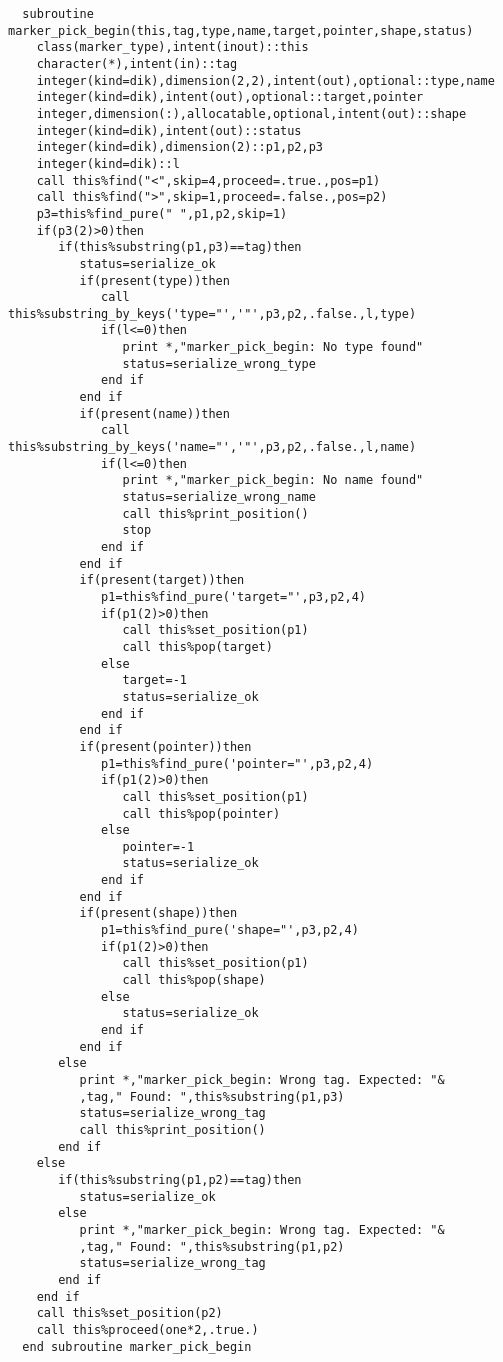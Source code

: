 \begin{Verbatim}
  subroutine marker_pick_begin(this,tag,type,name,target,pointer,shape,status)
    class(marker_type),intent(inout)::this
    character(*),intent(in)::tag
    integer(kind=dik),dimension(2,2),intent(out),optional::type,name
    integer(kind=dik),intent(out),optional::target,pointer
    integer,dimension(:),allocatable,optional,intent(out)::shape
    integer(kind=dik),intent(out)::status
    integer(kind=dik),dimension(2)::p1,p2,p3
    integer(kind=dik)::l
    call this%find("<",skip=4,proceed=.true.,pos=p1)
    call this%find(">",skip=1,proceed=.false.,pos=p2)
    p3=this%find_pure(" ",p1,p2,skip=1)
    if(p3(2)>0)then
       if(this%substring(p1,p3)==tag)then
          status=serialize_ok
          if(present(type))then
             call this%substring_by_keys('type="','"',p3,p2,.false.,l,type)
             if(l<=0)then
                print *,"marker_pick_begin: No type found"
                status=serialize_wrong_type
             end if
          end if
          if(present(name))then
             call this%substring_by_keys('name="','"',p3,p2,.false.,l,name)
             if(l<=0)then
                print *,"marker_pick_begin: No name found"
                status=serialize_wrong_name
                call this%print_position()
                stop
             end if
          end if
          if(present(target))then
             p1=this%find_pure('target="',p3,p2,4)
             if(p1(2)>0)then
                call this%set_position(p1)
                call this%pop(target)
             else
                target=-1
                status=serialize_ok
             end if
          end if
          if(present(pointer))then
             p1=this%find_pure('pointer="',p3,p2,4)
             if(p1(2)>0)then
                call this%set_position(p1)
                call this%pop(pointer)
             else
                pointer=-1
                status=serialize_ok
             end if
          end if
          if(present(shape))then
             p1=this%find_pure('shape="',p3,p2,4)
             if(p1(2)>0)then
                call this%set_position(p1)
                call this%pop(shape)
             else
                status=serialize_ok
             end if
          end if
       else
          print *,"marker_pick_begin: Wrong tag. Expected: "&
          ,tag," Found: ",this%substring(p1,p3)
          status=serialize_wrong_tag
          call this%print_position()
       end if
    else
       if(this%substring(p1,p2)==tag)then
          status=serialize_ok
       else
          print *,"marker_pick_begin: Wrong tag. Expected: "&
          ,tag," Found: ",this%substring(p1,p2)
          status=serialize_wrong_tag
       end if
    end if
    call this%set_position(p2)
    call this%proceed(one*2,.true.)
  end subroutine marker_pick_begin
\end{Verbatim}

